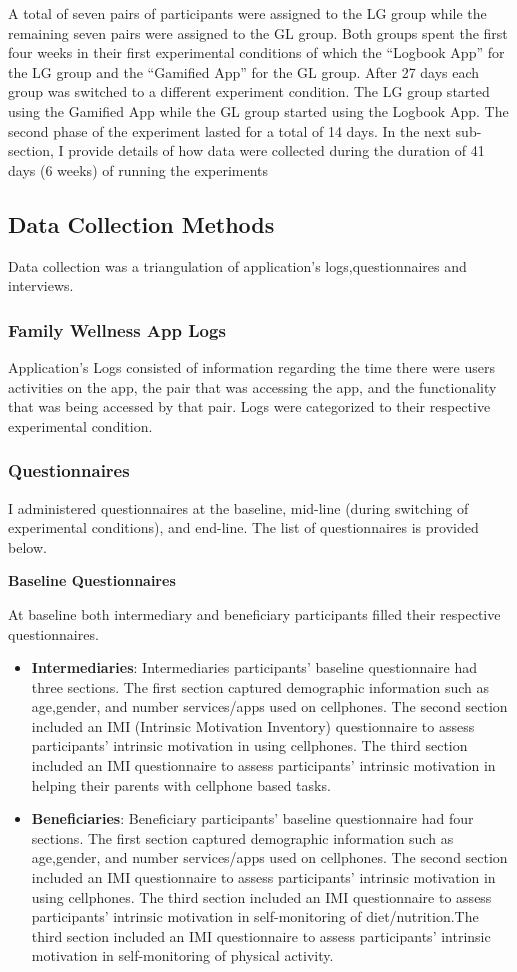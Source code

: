 A total of seven pairs of participants were assigned to the LG group while the remaining seven pairs were assigned to the GL group. Both groups spent the first four weeks in their first experimental conditions of which the ``Logbook App'' for the LG group and the ``Gamified App'' for the GL group. After 27 days each group was switched to a different experiment condition. The LG group started using the Gamified App while the GL group started using the Logbook App. The second phase of the experiment lasted for a total of 14 days. In the next sub-section, I provide details of how data were collected during the duration of 41 days (6 weeks) of running the experiments 

\subsection{Data Collection Methods}
Data collection was a triangulation of application's logs,questionnaires and interviews. 
\subsubsection{Family Wellness App Logs}
Application's Logs consisted of information regarding the time there were users activities on the app, the pair that was accessing the app, and the functionality that was being accessed by that  pair. Logs were categorized to their respective experimental condition. 
\subsubsection{Questionnaires}
I administered questionnaires at the baseline, mid-line (during switching of experimental conditions), and end-line. The list of questionnaires is provided below.

\textbf{Baseline Questionnaires}

At baseline both intermediary and beneficiary participants filled their respective questionnaires. 
\begin{itemize}
\item{\textbf{Intermediaries}}: Intermediaries participants' baseline questionnaire had three sections. The first section captured demographic information such as age,gender, and number services/apps used on cellphones. The second section included an IMI (Intrinsic Motivation Inventory) questionnaire  to assess participants' intrinsic motivation in using cellphones. The third section included an IMI questionnaire to assess participants' intrinsic motivation in helping their parents with cellphone based tasks.
\item{\textbf{Beneficiaries}}: Beneficiary participants' baseline questionnaire had four sections. The first section captured demographic information such as age,gender, and number services/apps used on cellphones. The second section included an IMI questionnaire to assess participants' intrinsic motivation in using cellphones. The third section included an IMI questionnaire to assess participants' intrinsic motivation in self-monitoring of diet/nutrition.The third section included an IMI questionnaire to assess participants' intrinsic motivation in self-monitoring of physical activity.
\end{itemize}

